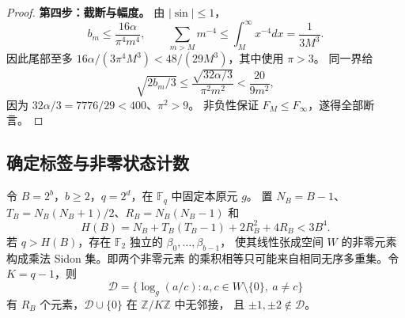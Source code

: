 \begin{proof}
\textbf{第四步：截断与幅度。}
由 $|\sin|\le1$，
\[
 b_m\le\frac{16\alpha}{\pi^4m^4},\qquad
 \sum_{m>M}m^{-4}\le\int_M^\infty x^{-4}dx=\frac1{3M^3}.
\]
因此尾部至多 $16\alpha/(3\pi^4M^3)<48/(29M^3)$，其中使用 $\pi>3$。
同一界给
\[
 \sqrt{2b_m/3}\le\frac{\sqrt{32\alpha/3}}{\pi^2m^2}
 <\frac{20}{9m^2},
\]
因为 $32\alpha/3=7776/29<400$、$\pi^2>9$。
非负性保证 $F_M\le F_\infty$，遂得全部断言。
\end{proof}

\subsection{确定标签与非零状态计数}
\begin{lemma}[有限域标签的存在]\label{lem:papersidon}
令 $B=2^b$，$b\ge2$，$q=2^d$，在 $\mathbb F_q$ 中固定本原元 $g$。
置 $N_B=B-1$、$T_B=N_B(N_B+1)/2$、$R_B=N_B(N_B-1)$ 和
\[
 H(B)=N_B+T_B(T_B-1)+2R_B^2+4R_B<3B^4.
\]
若 $q>H(B)$，存在 $\mathbb F_2$ 独立的 $\beta_0,\ldots,\beta_{b-1}$，
使其线性张成空间 $W$ 的非零元素构成乘法 Sidon 集。即两个非零元素
的乘积相等只可能来自相同无序多重集。令 $K=q-1$，则
\[
 \mathcal D=\{\log_g(a/c):a,c\in W\setminus\{0\},\ a\ne c\}
\]
有 $R_B$ 个元素，$\mathcal D\cup\{0\}$ 在 $\mathbb Z/K\mathbb Z$ 中无邻接，
且 $\pm1,\pm2\notin\mathcal D$。
\end{lemma}
